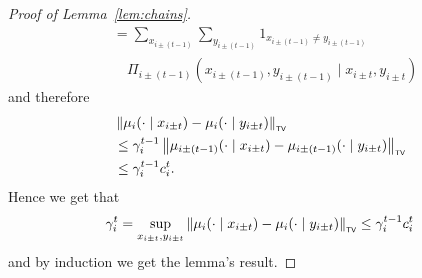 \documentclass[12pt,a4paper,oneside,onecolumn]{book}
\begin{document}
\begin{proof}[Proof of Lemma~\ref{lem:chains}]
\begin{align*}
  &= 
  \sum_{x_{i\pm (t-1)}}\sum_{y_{i\pm (t-1)}}   
  1_{x_{i\pm (t-1)} \neq y_{i\pm (t-1)}}\\
  &\quad\Pi_{i\pm (t-1)}(x_{i\pm (t-1)},y_{i\pm (t-1)}\mid x_{i\pm t},y_{i\pm t})  
\end{align*}
and therefore
\begin{align*}
  &\left\lVert\mu_i(\cdot\mid x_{i\pm t}) - \mu_i(\cdot\mid y_{i\pm t})\right\rVert_{\textup{\tiny\textsf{TV}}} \\
  &\leq
  \gamma_{i}^{t-1}
  \left\lVert\mu_{i\pm (t-1)}(\cdot\mid x_{i\pm t}) - \mu_{i\pm (t-1)}(\cdot\mid y_{i\pm t})\right\rVert_{\textup{\tiny\textsf{TV}}}\\
  &\leq
  \gamma_{i}^{t-1} c_i^t.  
\end{align*}
Hence we get that
\[
  \gamma_{i}^{t}
  = \sup_{x_{i\pm t},y_{i\pm t}}\left\lVert\mu_i(\cdot\mid x_{i\pm t}) - \mu_i(\cdot\mid y_{i\pm t})\right\rVert_{\textup{\tiny\textsf{TV}}}
  \leq
  \gamma_{i}^{t-1} c_i^t
\]
and by induction we get the lemma's result.
\end{proof}
\end{document}

